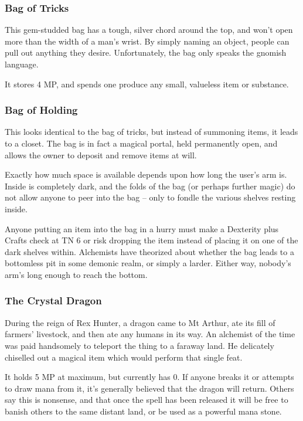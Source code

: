 \subsubsection{Bag of Tricks}
This gem-studded bag has a tough, silver chord around the top, and won't open more than the width of a man's wrist.  By simply naming an object, people can pull out anything they desire.  Unfortunately, the bag only speaks the gnomish language.

It stores 4 MP, and spends one produce any small, valueless item or substance.

\subsubsection{Bag of Holding}
This looks identical to the bag of tricks, but instead of summoning items, it leads to a closet.  The bag is in fact a magical portal, held permanently open, and allows the owner to deposit and remove items at will.

Exactly how much space is available depends upon how long the user's arm is.  Inside is completely dark, and the folds of the bag (or perhaps further magic) do not allow anyone to peer into the bag -- only to fondle the various shelves resting inside.

Anyone putting an item into the bag in a hurry must make a Dexterity plus Crafts check at TN 6 or risk dropping the item instead of placing it on one of the dark shelves within.  Alchemists have theorized about whether the bag leads to a bottomless pit in some demonic realm, or simply a larder.  Either way, nobody's arm's long enough to reach the bottom.

\subsubsection{The Crystal Dragon}
During the reign of Rex Hunter, a dragon came to Mt Arthur, ate its fill of farmers' livestock, and then ate any humans in its way.  An alchemist of the time was paid handsomely to teleport the thing to a faraway land.  He delicately chiselled out a magical item which would perform that single feat.  

It holds 5 MP at maximum, but currently has 0.  If anyone breaks it or attempts to draw mana from it, it's generally believed that the dragon will return.  Others say this is nonsense, and that once the spell has been released it will be free to banish others to the same distant land, or be used as a powerful mana stone.

